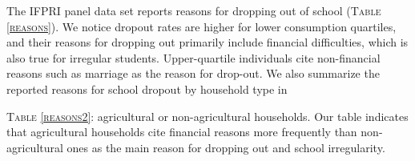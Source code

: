 \documentclass[12pt,letterpaper]{article}
\newcommand{\0}{\ensuremath{\mbox{\boldmath $0$}}}
\begin{document}
The IFPRI panel data set reports reasons for dropping out of school (\textsc{\small Table \ref{reasons}}). We notice dropout rates are higher for lower consumption quartiles, and their reasons for dropping out primarily include financial difficulties, which is also true for irregular students. Upper-quartile individuals cite non-financial reasons such as marriage as the reason for drop-out. We also summarize the reported reasons for school dropout by household type in {\textsc{\small Table \ref{reasons2}}: agricultural or non-agricultural households. Our table indicates that agricultural households cite financial reasons more frequently than non-agricultural ones as the main reason for dropping out and school irregularity. 

\begin{table}
\caption{Tabulation of Agricultural vs. Non-Agriculture household Consumption Quartiles}
\label{agpc4}
\begin{center}
{
}
\end{center}
\end{table}

}
\end{document}
